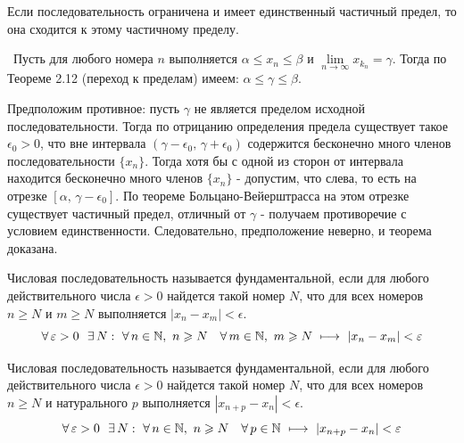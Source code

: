 \begin{theorem}
Если последовательность ограничена и имеет единственный частичный предел,
то она сходится к этому частичному пределу.

\vspace{3mm}

\proofname~Пусть для любого номера \(n\) выполняется \(\alpha \leq x_{n} \leq \beta\)
и \(\lim\limits_{n \to \infty}{x_{k_{n}}} = \gamma.\) Тогда по Теореме 2.12 
(переход к пределам) имеем: \(\alpha \leq \gamma \leq \beta.\)

Предположим противное: пусть \(\gamma\) не является пределом исходной последовательности.
Тогда по отрицанию определения предела существует такое \(\epsilon_{0} > 0\), 
что вне интервала \((\gamma - \epsilon_{0}, \, \gamma + \epsilon_{0})\) содержится
бесконечно много членов последовательности \(\{x_{n}\}\).
Тогда хотя бы с одной из сторон от интервала находится бесконечно много членов \(\{x_{n}\}\)
- допустим, что слева, то есть на отрезке \([\alpha, \, \gamma - \epsilon_{0}].\) 
По теореме Больцано-Вейерштрасса на этом отрезке существует частичный предел,
отличный от \(\gamma\) - получаем противоречие с условием единственности.
Следовательно, предположение неверно, и теорема доказана.~\qedsymbol
\end{theorem}


\begin{definition}[Вариант 1]
Числовая последовательность называется фундаментальной, если для любого
действительного числа \(\epsilon > 0\) найдется такой номер \(N\), что
для всех номеров \(n \geq N\) и \(m \geq N\) выполняется \(|x_{n} - x_{m}| < \epsilon\).
\[
\forall \, \varepsilon > 0 ~~ \exists \, N : ~ \forall \, n \in \mathbb{N}, ~ n \geqslant N \hspace{1em}
\forall \, m \in \mathbb{N}, ~ m \geqslant N ~ \longmapsto ~ |x_{n} - x_{m}| < \varepsilon
\]
\end{definition}

\begin{definition}[Вариант 2]
 Числовая последовательность называется фундаментальной, если для любого
действительного числа \(\epsilon > 0\) найдется такой номер \(N\), что
для всех номеров \(n \geq N\) и натурального \(p\) выполняется \(|x_{n+p} - x_{n}| < \epsilon\).
\[
\forall \, \varepsilon > 0 ~~ \exists \, N : ~ \forall \, n \in \mathbb{N}, ~ n \geqslant N \hspace{1em}
\forall \, p \in \mathbb{N} ~ \longmapsto ~ |x_{n+p} - x_{n}| < \varepsilon
\]
\end{definition}

